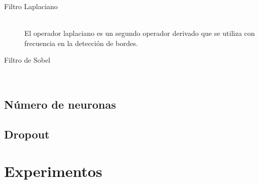 \begin{description}
	\item[Filtro Laplaciano] \hfill 
	\vspace{10pt}
	\\
	El operador laplaciano es un segundo operador derivado que se utiliza con frecuencia en la detección de bordes. \cite{4135681}
	\item[Filtro de Sobel] \hfill 
	\vspace{10pt}
	\\
\end{description}

\subsection{Número de neuronas}

\subsection{Dropout}

\section{Experimentos}



